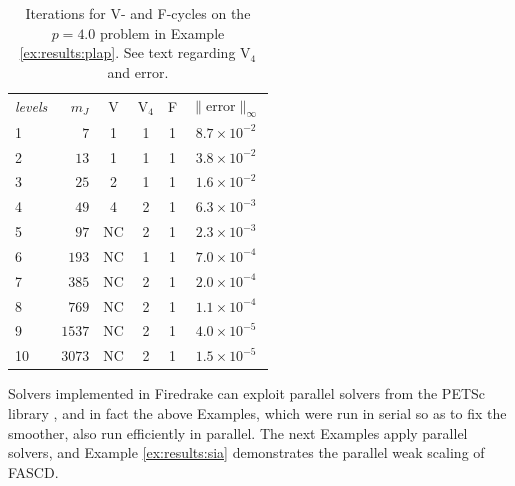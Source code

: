 \documentclass[letterpaper,final,12pt,reqno]{amsart}
\theoremstyle{cstyle}
\theoremstyle{cstyle*}
\theoremstyle{dstyle}
\numberwithin{equation}{section}
\numberwithin{figure}{section}
\numberwithin{table}{section}
\numberwithin{theorem}{section}
\begin{document}
\begin{table}[ht]
\begin{tabular}{lr@{\hskip 7mm}c@{\hskip 4mm}c@{\hskip 4mm}c@{\hskip 6mm}c}
\emph{levels} & $m_J$ & V & V$_4$ & F & $\|$error$\|_\infty$ \\ \cmidrule{1-6}
 1 &    $7$ &  1 &  1 &  1 & $8.7 \times 10^{-2}$ \\
 2 &   $13$ &  1 &  1 &  1 & $3.8 \times 10^{-2}$ \\
 3 &   $25$ &  2 &  1 &  1 & $1.6 \times 10^{-2}$ \\
 4 &   $49$ &  4 &  2 &  1 & $6.3 \times 10^{-3}$ \\
 5 &   $97$ & NC &  2 &  1 & $2.3 \times 10^{-3}$ \\
 6 &  $193$ & NC &  1 &  1 & $7.0 \times 10^{-4}$ \\
 7 &  $385$ & NC &  2 &  1 & $2.0 \times 10^{-4}$ \\
 8 &  $769$ & NC &  2 &  1 & $1.1 \times 10^{-4}$ \\
 9 & $1537$ & NC &  2 &  1 & $4.0 \times 10^{-5}$ \\
10 & $3073$ & NC &  2 &  1 & $1.5 \times 10^{-5}$
\end{tabular}
\bigskip
\caption{Iterations for V- and F-cycles on the $p=4.0$ problem in Example \ref{ex:results:plap}.  See text regarding V$_4$ and error.}
\label{tab:results:degenerateplap1d}
\end{table}

Solvers implemented in Firedrake can exploit parallel solvers from the PETSc library \cite{Balayetal2023}, and in fact the above Examples, which were run in serial so as to fix the smoother, also run efficiently in parallel.  The next Examples apply parallel solvers, and Example \ref{ex:results:sia} demonstrates the parallel weak scaling \cite{Bueler2021} of FASCD.
\end{document}
